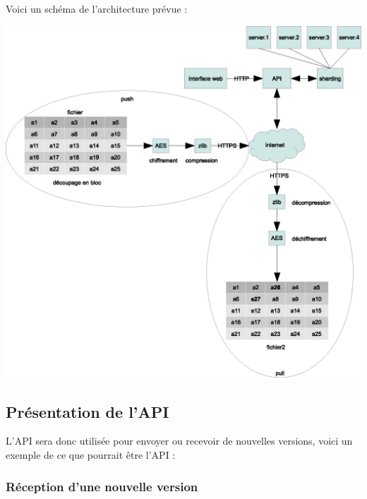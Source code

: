 Voici un schéma de l'architecture prévue :

\includegraphics[scale=0.5]{img/schema.eps}

\subsection{Présentation de l'API}

L'API sera donc utilisée pour envoyer ou recevoir de nouvelles versions, voici un exemple de ce que pourrait être l'API :

\subsubsection{Réception d'une nouvelle version}

